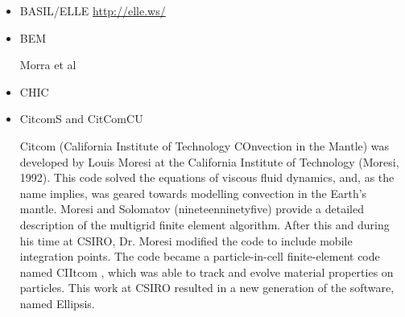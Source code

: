 \begin{itemize}
\item {\codefont BASIL/ELLE} \url{http://elle.ws/}

\begin{scriptsize}
\cite{bokj08}
\cite{llor19}
\end{scriptsize}

\item {\codefont BEM} 

\begin{scriptsize}
\cite{crsr83}
\cite{katl95}
\cite{moct07}
\cite{moct09}
Morra et al \cite{moyb10}\\
\cite{qumm12}\cite{buqm12}
\cite{quhm13}
\cite{gert19}
\end{scriptsize}

\item {\codefont CHIC}  

\begin{scriptsize}
\cite{norv15}
\end{scriptsize}

\item {\codefont CitcomS} and {\codefont CitComCU} 

Citcom (California Institute of Technology COnvection in the Mantle) was  developed by Louis
Moresi at the California Institute of Technology (Moresi, 1992). This code solved the equations
of viscous fluid dynamics, and, as the name implies, was geared towards modelling convection in
the Earth’s mantle. Moresi and Solomatov (nineteenninetyfive) provide a detailed description of the multigrid
finite element algorithm. After this and during his time at CSIRO, Dr. Moresi modified the code to
include mobile integration points. The code became a particle-in-cell finite-element code named
CIItcom , which was able to track and evolve material properties on particles. This work at
CSIRO resulted in a new generation of the software, named Ellipsis.


\end{itemize}
